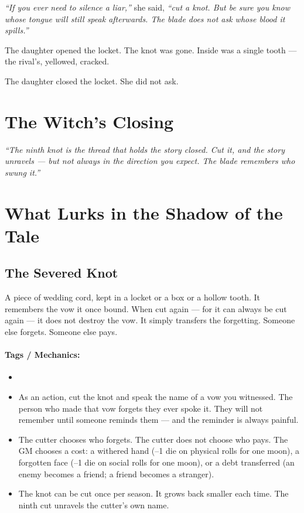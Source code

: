 \textit{``If you ever need to silence a liar,''} she said, \textit{``cut a knot. But be sure you know whose tongue will still speak afterwards. The blade does not ask whose blood it spills.''}

The daughter opened the locket. The knot was gone. Inside was a single tooth --- the rival's, yellowed, cracked.

The daughter closed the locket. She did not ask.

\section*{The Witch's Closing}

\textit{``The ninth knot is the thread that holds the story closed. Cut it, and the story unravels --- but not always in the direction you expect. The blade remembers who swung it.''}

\section*{What Lurks in the Shadow of the Tale}

\subsection*{The Severed Knot}

A piece of wedding cord, kept in a locket or a box or a hollow tooth. It remembers the vow it once bound. When cut again --- for it can always be cut again --- it does not destroy the vow. It simply transfers the forgetting. Someone else forgets. Someone else pays.

\paragraph{Tags / Mechanics:}
\begin{itemize}
\item [CURSE] [TRUTH] [OATH]
\item As an action, cut the knot and speak the name of a vow you witnessed. The person who made that vow forgets they ever spoke it. They will not remember until someone reminds them --- and the reminder is always painful.
\item The cutter chooses who forgets. The cutter does not choose who pays. The GM chooses a cost: a withered hand (--1 die on physical rolls for one moon), a forgotten face (--1 die on social rolls for one moon), or a debt transferred (an enemy becomes a friend; a friend becomes a stranger).
\item The knot can be cut once per season. It grows back smaller each time. The ninth cut unravels the cutter's own name.
\end{itemize}

